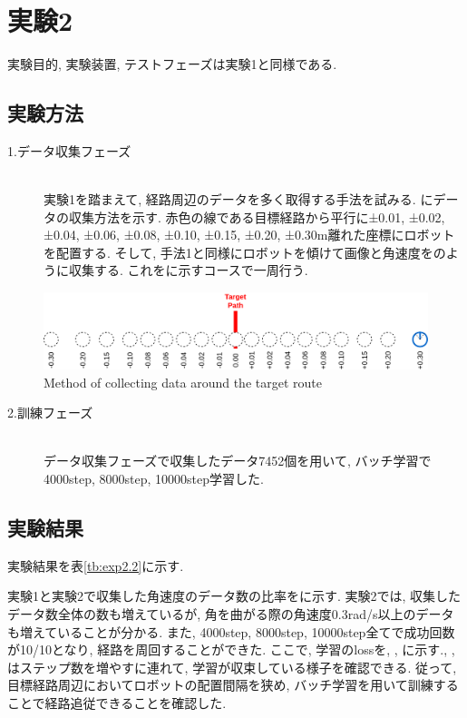 \newpage
\section{実験2}
実験目的, 実験装置, テストフェーズは実験1と同様である.
\subsection{実験方法}
\begin{description}
  \item[1.データ収集フェーズ]\mbox{}\\実験1を踏まえて, 経路周辺のデータを多く取得する手法を試みる. にデータの収集方法を示す. 赤色の線である目標経路から平行に±0.01, ±0.02, ±0.04, ±0.06, ±0.08, ±0.10, ±0.15, ±0.20, ±0.30m離れた座標にロボットを配置する. そして, 手法1と同様にロボットを傾けて画像と角速度をのように収集する. これをに示すコースで一周行う.  
\end{description}

\begin{figure}[h]
  \centering
  \includegraphics[keepaspectratio, scale=0.18]{images/collect-data.png}
  \caption{Method of collecting data around the target route}
  \label{Fig:collect-data}
  \end{figure}

\begin{description}
  \item[2.訓練フェーズ]\mbox{}\\データ収集フェーズで収集したデータ7452個を用いて, バッチ学習で4000step, 8000step, 10000step学習した. 
\end{description}

\newpage
\subsection{実験結果}
実験結果を表\ref{tb:exp2.2}に示す. 
\par 実験1と実験2で収集した角速度のデータ数の比率をに示す. 実験2では, 収集したデータ数全体の数も増えているが, 角を曲がる際の角速度0.3rad/s以上のデータも増えていることが分かる. また, 4000step, 8000step, 10000step全てで成功回数が10/10となり, 経路を周回することができた. ここで, 学習のlossを, , に示す., , はステップ数を増やすに連れて, 学習が収束している様子を確認できる. 従って, 目標経路周辺においてロボットの配置間隔を狭め, バッチ学習を用いて訓練することで経路追従できることを確認した. 


